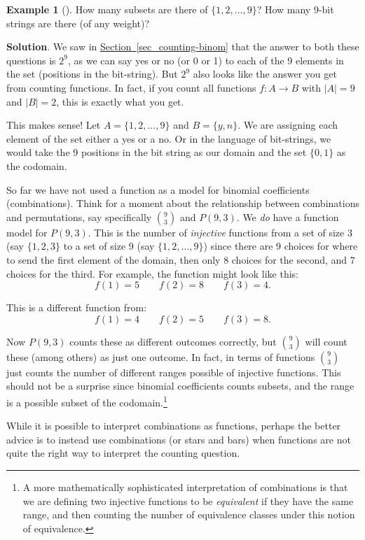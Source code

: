 \documentclass[10pt,]{book}
\theoremstyle{plain}
\theoremstyle{definition}
\theoremstyle{definition}
\newtheorem{example}[theorem]{Example}
\theoremstyle{definition}
\theoremstyle{definition}
\numberwithin{equation}{chapter}
\begin{document}
\begin{example}[]\label{example-21}
\hypertarget{p-1019}{}%
How many subsets are there of \(\{1,2,\ldots, 9\}\)? How many 9-bit strings are there (of any weight)?%
\par\smallskip%
\noindent\textbf{Solution}.\hypertarget{solution-88}{}\quad%
\hypertarget{p-1020}{}%
We saw in \hyperref[sec_counting-binom]{Section~\ref{sec_counting-binom}} that the answer to both these questions is \(2^9\), as we can say yes or no (or 0 or 1) to each of the 9 elements in the set (positions in the bit-string). But \(2^9\) also looks like the answer you get from counting functions. In fact, if you count all functions \(f: A \to B\) with \(|A| = 9\) and \(|B| = 2\), this is exactly what you get.%
\par
\hypertarget{p-1021}{}%
This makes sense! Let \(A = \{1,2,\ldots, 9\}\) and \(B = \{y, n\}\). We are assigning each element of the set either a yes or a no. Or in the language of bit-strings, we would take the 9 positions in the bit string as our domain and the set \(\{0,1\}\) as the codomain.%
\end{example}
\hypertarget{p-1022}{}%
So far we have not used a function as a model for binomial coefficients (combinations). Think for a moment about the relationship between combinations and permutations, say specifically \({9 \choose 3}\) and \(P(9,3)\). We \emph{do} have a function model for \(P(9,3)\). This is the number of \emph{injective} functions from a set of size 3 (say \(\{1,2,3\}\) to a set of size 9 (say \(\{1,2,\ldots, 9\}\)) since there are 9 choices for where to send the first element of the domain, then only 8 choices for the second, and 7 choices for the third. For example, the function might look like this:%
\begin{equation*}
f(1) = 5 \qquad f(2) = 8 \qquad f(3) = 4.
\end{equation*}
%
\par
\hypertarget{p-1023}{}%
This is a different function from:%
\begin{equation*}
f(1) = 4 \qquad f(2) = 5 \qquad f(3) = 8.
\end{equation*}
%
\par
\hypertarget{p-1024}{}%
Now \(P(9,3)\) counts these as different outcomes correctly, but \({9\choose 3}\) will count these (among others) as just one outcome. In fact, in terms of functions \({9 \choose 3}\) just counts the number of different ranges possible of injective functions. This should not be a surprise since binomial coefficients counts subsets, and the range is a possible subset of the codomain.\footnote{A more mathematically sophisticated interpretation of combinations is that we are defining two injective functions to be \emph{equivalent} if they have the same range, and then counting the number of equivalence classes under this notion of equivalence.\label{fn-8}}%
\par
\hypertarget{p-1025}{}%
While it is possible to interpret combinations as functions, perhaps the better advice is to instead use combinations (or stars and bars) when functions are not quite the right way to interpret the counting question.%
\typeout{************************************************}
\typeout{************************************************}
\end{document}
